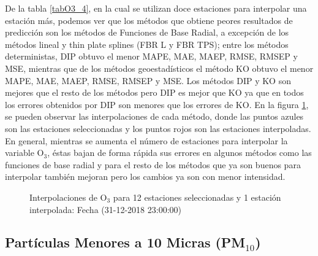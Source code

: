 De la tabla \ref{tabO3_4}, en la cual se utilizan doce estaciones para interpolar una estación más, podemos ver que los métodos que obtiene peores resultados de predicción son los métodos de Funciones de Base Radial, a excepción de los métodos lineal y thin plate splines (FBR L y FBR TPS); entre los métodos deterministas, DIP obtuvo el menor MAPE, MAE, MAEP, RMSE, RMSEP y MSE, mientras que de los métodos geoestadísticos el método KO obtuvo el menor MAPE, MAE, MAEP, RMSE, RMSEP y MSE. Los métodos DIP y KO son mejores que el resto de los métodos pero DIP es mejor que KO ya que en todos los errores obtenidos por DIP son menores que los errores de KO. En la figura \ref{O3figure4}, se pueden observar las interpolaciones de cada método, donde las puntos azules son las estaciones seleccionadas y los puntos rojos son las estaciones interpoladas. En general, mientras se aumenta el número de estaciones para interpolar la variable O$_{3}$, éstas bajan de forma rápida sus errores en algunos métodos como las funciones de base radial y para el resto de los métodos que ya son buenos para interpolar también mejoran pero los cambios ya son con menor intensidad.


\begin{figure}[H]
\centering
{}
\subfigure[KO] {\texttt{[image: ./ok\_12\_4\_26302]}}
\subfigure[KU] {\texttt{[image: ./uk\_12\_4\_26302]}}
\caption{Interpolaciones de O$_{3}$ para 12 estaciones seleccionadas y 1 estación interpolada: Fecha (31-12-2018 23:00:00)}
\label{O3figure4}
\end{figure}





\subsection{Partículas Menores a 10 Micras (PM$_{10}$)}

